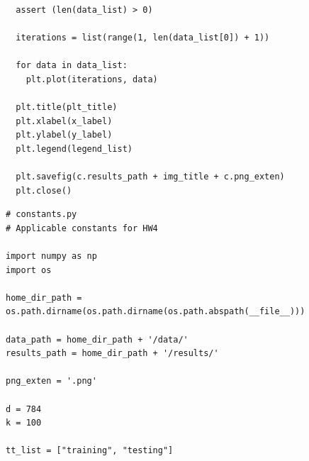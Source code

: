 \documentclass{article}
\newcommand{\1}{\mathbf{1}}
\begin{document}
{\begin{verbatim}
  assert (len(data_list) > 0)

  iterations = list(range(1, len(data_list[0]) + 1))

  for data in data_list:
    plt.plot(iterations, data)

  plt.title(plt_title)
  plt.xlabel(x_label)
  plt.ylabel(y_label)
  plt.legend(legend_list)

  plt.savefig(c.results_path + img_title + c.png_exten)
  plt.close()

\end{verbatim}

\begin{verbatim}
# constants.py
# Applicable constants for HW4

import numpy as np
import os

home_dir_path = os.path.dirname(os.path.dirname(os.path.abspath(__file__)))

data_path = home_dir_path + '/data/'
results_path = home_dir_path + '/results/'

png_exten = '.png'

d = 784
k = 100

tt_list = ["training", "testing"]
\end{verbatim}

\newpage

}
\end{document}
